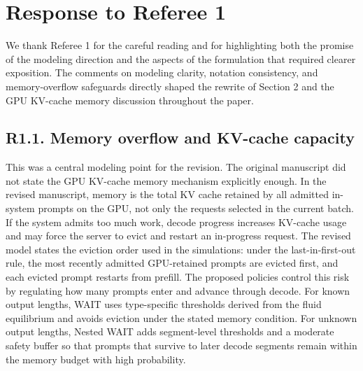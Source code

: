 \section*{Response to Referee 1}

We thank Referee 1 for the careful reading and for highlighting both the promise of the modeling direction and the aspects of the formulation that required clearer exposition. The comments on modeling clarity, notation consistency, and memory-overflow safeguards directly shaped the rewrite of Section 2 and the GPU KV-cache memory discussion throughout the paper.

\subsection*{R1.1. Memory overflow and KV-cache capacity}


\response This was a central modeling point for the revision. The original manuscript did not state the GPU KV-cache memory mechanism explicitly enough. In the revised manuscript, memory is the total KV cache retained by all admitted in-system prompts on the GPU, not only the requests selected in the current batch. If the system admits too much work, decode progress increases KV-cache usage and may force the server to evict and restart an in-progress request. The revised model states the eviction order used in the simulations: under the last-in-first-out rule, the most recently admitted GPU-retained prompts are evicted first, and each evicted prompt restarts from prefill. The proposed policies control this risk by regulating how many prompts enter and advance through decode. For known output lengths, WAIT uses type-specific thresholds derived from the fluid equilibrium and avoids eviction under the stated memory condition. For unknown output lengths, Nested WAIT adds segment-level thresholds and a moderate safety buffer so that prompts that survive to later decode segments remain within the memory budget with high probability.

